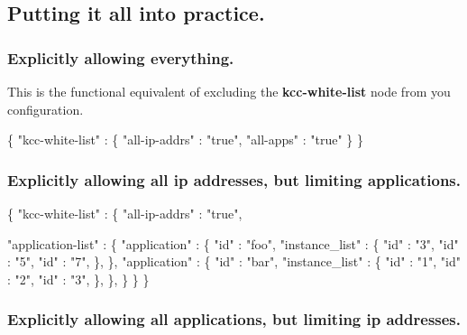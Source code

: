 \subsection*{Putting it all into practice.}

\subsubsection*{Explicitly allowing everything.}

This is the functional equivalent of excluding the {\bfseries kcc-\/white-\/list} node from you configuration. 
\begin{DoxyCode}
\{
  \textcolor{stringliteral}{"kcc-white-list"} : \{
    \textcolor{stringliteral}{"all-ip-addrs"} : \textcolor{stringliteral}{"true"},
    \textcolor{stringliteral}{"all-apps"}     : \textcolor{stringliteral}{"true"}
  \}
\}
\end{DoxyCode}


\subsubsection*{Explicitly allowing all ip addresses, but limiting applications.}


\begin{DoxyCode}
\{
  \textcolor{stringliteral}{"kcc-white-list"} : \{
    \textcolor{stringliteral}{"all-ip-addrs"}     : \textcolor{stringliteral}{"true"},

    \textcolor{stringliteral}{"application-list"} : \{
      \textcolor{stringliteral}{"application"} : \{
        \textcolor{stringliteral}{"id"}            : \textcolor{stringliteral}{"foo"},
        \textcolor{stringliteral}{"instance\_list"} : \{
          \textcolor{stringliteral}{"id"} : \textcolor{stringliteral}{"3"},
          \textcolor{stringliteral}{"id"} : \textcolor{stringliteral}{"5"},
          \textcolor{stringliteral}{"id"} : \textcolor{stringliteral}{"7"},
        \},
      \},
      \textcolor{stringliteral}{"application"} : \{
        \textcolor{stringliteral}{"id"}            : \textcolor{stringliteral}{"bar"},
        \textcolor{stringliteral}{"instance\_list"} : \{
          \textcolor{stringliteral}{"id"} : \textcolor{stringliteral}{"1"},
          \textcolor{stringliteral}{"id"} : \textcolor{stringliteral}{"2"},
          \textcolor{stringliteral}{"id"} : \textcolor{stringliteral}{"3"},
        \},
      \},
    \}
  \}
\}
\end{DoxyCode}


\subsubsection*{Explicitly allowing all applications, but limiting ip addresses.}


